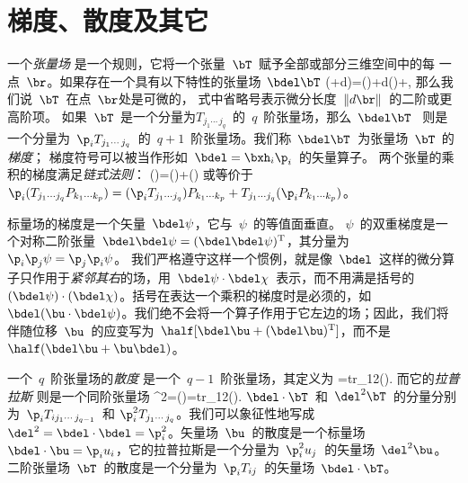 \section{梯度、散度及其它}

一个{\em 张量场\/}
%
是一个规则，它将一个张量~$\bT$~赋予全部或部分三维空间中的每
一点~$\br$。如果存在一个具有以下特性的张量场~$\bdel\bT$
\eq \label{A.differ}
\bT(\br+d\/\br)=\bT(\br)+d\/\br\cdot\bdel\bT(\br)+\cdots,
\en
那么我们说~$\bT$~在点~$\br$处是可微的，
式中省略号表示微分长度~$\|d\/\br\|$~的二阶或更高阶项。
如果~$\bT$~是一个分量为$T_{j_1\cdots\,j_q}$~的~$q$~阶张量场，那么~$\bdel\bT$~ 则是一个分量为~$\p_iT_{j_1\cdots\,j_q}$~的~$q+1$~阶张量场。我们称~$\bdel\bT$~为张量场~$\bT$~的{\em 梯度\/}；
%
%
梯度符号可以被当作形如~$\bdel=\bxh_i\p_i$~的矢量算子。
两个张量的乘积的梯度满足{\em 链式法则\/}：
%
\eq
\bdel(\bT\bP)=(\bdel\bT)\bP+\bT(\bdel\bP)
\en
或等价于~$\p_i(T_{j_1\cdots j_q}P_{k_1\cdots k_p})
=(\p_iT_{j_1\cdots j_q})P_{k_1\cdots k_p}+
T_{j_1\cdots j_q}(\p_iP_{k_1\cdots k_p})$。

标量场的梯度是一个矢量~$\bdel\psi$，它与~$\psi$~的等值面垂直。 
$\psi$~的双重梯度是一个对称二阶张量~$\bdel\bdel\psi=(\bdel\bdel\psi)^{\rm T}$，其分量为~$\p_i\p_j\psi=\p_j\p_i\psi$。
我们严格遵守这样一个惯例，就是像~$\bdel$~这样的微分算子只作用于{\em 紧邻其右\/}的场，用~$\bdel\psi\cdot\bdel\chi$~表示，而不用满是括号的~ $(\bdel\psi)\cdot(\bdel\chi)$。括号在表达一个乘积的梯度时是必须的，如~ $\bdel(\bu\cdot\bdel\psi)$。我们绝不会将一个算子作用于它左边的场；因此，我们将伴随位移~$\bu$~的应变写为~$\half[\bdel\bu+(\bdel\bu)^{\rm T}]$，而不是~ $\half(\bdel\bu+\bu\bdel)$。

一个~$q$~阶张量场的{\em 散度\/}
%
%
是一个~$q-1$~阶张量场，其定义为
\eq \label{A.diverg}
\bdel\cdot\bT={\rm tr}_{12}(\bdel\bT).
\en
而它的{\em 拉普拉斯\/}
%
%
则是一个同阶张量场
\eq \label{A.delsq}
\del^2\bT=\bdel\cdot(\bdel\bT)={\rm tr}_{12}(\bdel\bdel\bT).
\en
$\bdel\cdot\bT$~和~$\del^2\bT$~的分量分别为~$\p_iT_{ij_1\cdots\,j_{q-1}}$~和 \vspace{-0.5 mm}
$\p_i^2T_{j_1\cdots\,j_q}$。我们可以象征性地写成~
$\del^2=\bdel\cdot\bdel=\p_i^2$。矢量场~$\bu$~的散度是一个标量场~ $\bdel\cdot\bu=\p_iu_i$，它的拉普拉斯是一个分量为~$\p_i^2u_j$~的矢量场~$\del^2\bu$。
二阶张量场~$\bT$~的散度是一个分量为~$\p_iT_{ij}$~的矢量场~$\bdel\cdot\bT$。

